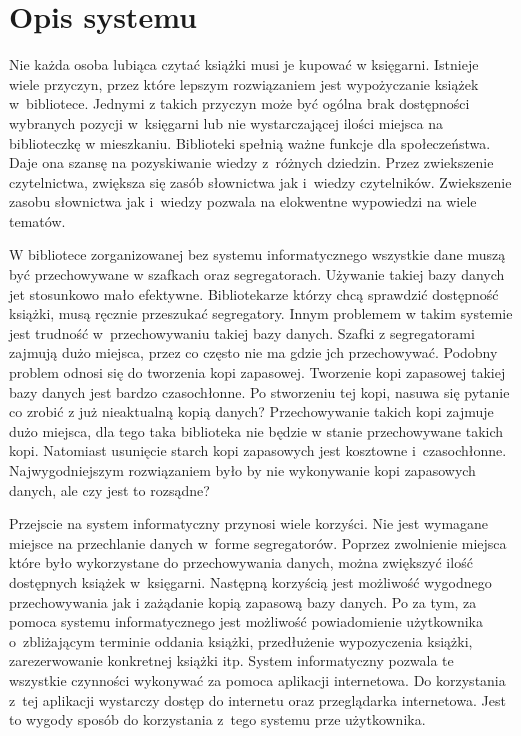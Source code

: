 \documentclass[12pt]{article}
\begin{document}


\tableofcontents
\addtocounter{page}{1}

\newpage
\section{Opis systemu}
Nie każda osoba lubiąca czytać książki musi je kupować w księgarni. Istnieje wiele przyczyn, przez które lepszym rozwiązaniem jest wypożyczanie książek w~bibliotece. Jednymi z takich przyczyn może być ogólna brak dostępności wybranych pozycji w~księgarni lub nie wystarczającej ilości miejsca na biblioteczkę w mieszkaniu. Biblioteki spełnią ważne funkcje dla społeczeństwa. Daje ona szansę na pozyskiwanie wiedzy z~różnych dziedzin. Przez zwiekszenie czytelnictwa, zwiększa się zasób słownictwa jak i~wiedzy czytelników. Zwiekszenie zasobu słownictwa jak i~wiedzy pozwala na elokwentne wypowiedzi na wiele tematów. 

W bibliotece zorganizowanej bez systemu informatycznego wszystkie dane muszą być przechowywane w szafkach oraz segregatorach. Używanie takiej bazy danych jet stosunkowo mało efektywne. Bibliotekarze którzy chcą sprawdzić dostępność książki, musą ręcznie przeszukać segregatory. Innym problemem w takim systemie jest trudność w~przechowywaniu takiej bazy danych. Szafki z segregatorami zajmują dużo miejsca, przez co często nie ma gdzie jch przechowywać. Podobny problem odnosi się do tworzenia kopi zapasowej. Tworzenie kopi zapasowej takiej bazy danych jest bardzo czasochłonne. Po stworzeniu tej kopi, nasuwa się pytanie co zrobić z już nieaktualną kopią danych? Przechowywanie takich kopi zajmuje dużo miejsca, dla tego taka biblioteka nie będzie w stanie przechowywane takich kopi. Natomiast usunięcie starch kopi zapasowych jest kosztowne i~czasochłonne. Najwygodniejszym rozwiązaniem było by nie wykonywanie kopi zapasowych danych, ale czy jest to rozsądne?

Przejscie na system informatyczny przynosi wiele korzyści. Nie jest wymagane miejsce na przechlanie danych w~forme segregatorów. Poprzez zwolnienie miejsca które było wykorzystane do przechowywania danych, można zwiększyć ilość dostępnych książek w~księgarni. Następną korzyścią jest możliwość wygodnego przechowywania jak i zażądanie kopią zapasową bazy danych. Po za tym, za pomoca systemu informatycznego jest możliwość powiadomienie użytkownika o~zbliżającym terminie oddania książki, przedłużenie wypozyczenia książki, zarezerwowanie konkretnej książki itp. System informatyczny pozwala te wszystkie czynności wykonywać za pomoca aplikacji internetowa. Do korzystania z~tej aplikacji wystarczy dostęp do internetu oraz przeglądarka internetowa. Jest to wygody sposób do korzystania z~tego systemu prze użytkownika.
\end{document}
